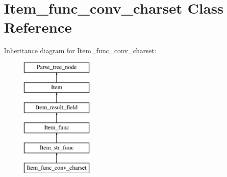 \hypertarget{classItem__func__conv__charset}{}\section{Item\+\_\+func\+\_\+conv\+\_\+charset Class Reference}
\label{classItem__func__conv__charset}
Inheritance diagram for Item\+\_\+func\+\_\+conv\+\_\+charset\+:\begin{figure}[H]
\begin{center}
\leavevmode
\includegraphics[height=6.000000cm]{classItem__func__conv__charset}
\end{center}
\end{figure}
